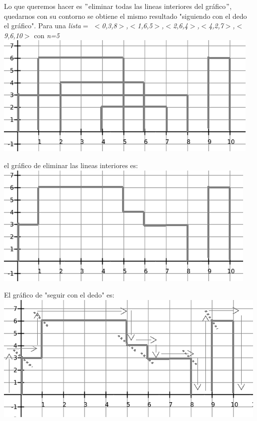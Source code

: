 \documentclass{article}
\begin{document}
Lo que queremos hacer es $"$eliminar todas las lineas interiores del gr\'afico$"$, quedarnos con su contorno se obtiene el mismo resultado  "siguiendo con el dedo el gr\'afico". \newpage
Para una \textit{lista$=$ $<$0,3,8$>$,$<$1,6,5$>$,$<$2,6,4$>$,$<$4,2,7$>$,$<$9,6,10$>$} con \textit{n=5} \newline
\includegraphics[width=\textwidth,height=\textheight,keepaspectratio
]{edificiosGraf2.png}
\begin {flushleft}
\end{flushleft}
el gr\'afico de eliminar las lineas interiores es:\newline
\includegraphics[width=\textwidth,height=\textheight,keepaspectratio
]{edificiosGraf2b.png}
\begin {flushleft}
\end{flushleft}
\newpage
El gr\'afico de "seguir con el dedo" es: \newline
\includegraphics[width=\textwidth,height=\textheight,keepaspectratio
]{edificiosGraf2c.png}
\begin {flushleft}
\end{flushleft}
\end{document}
